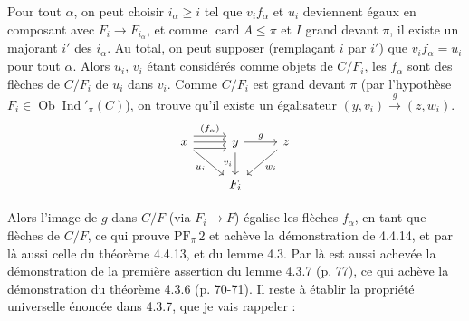 \documentclass[11pt]{article}
\newcommand{\printedpage}[1]{\marginpar{\footnotesize p.~#1}}
\newcommand{\msp}[1]{\marginpar{\footnotesize [#1]}}
\newcommand{\Ind}{\operatorname{Ind}}
\newcommand{\Ob}{\operatorname{Ob}}
\newcommand{\card}{\operatorname{card}}
\newcommand{\PF}{\mathrm{PF}}
\begin{document}
Pour tout $\alpha$, on peut choisir $i_\alpha\geqslant i$ tel que $v_if_\alpha$ et $u_i$ deviennent égaux en composant avec $F_i\longrightarrow F_{i_\alpha}$, et comme $\card A\leqslant\pi$ et $I$ grand devant $\pi$, il existe un majorant $i'$ des $i_\alpha$. Au total, on peut supposer (remplaçant $i$ par $i'$) que $v_if_\alpha=u_i$ pour tout $\alpha$. Alors $u_i$, $v_i$ étant considérés comme objets de $C/F_i$, les $f_\alpha$ sont des flèches de $C/F_i$ de $u_i$ dans $v_i$. Comme $C/F_i$ est grand devant $\pi$ (par l'hypothèse $F_i\in\Ob\Ind'_\pi(C)$), on trouve qu'il existe un égalisateur $(y,v_i)\xrightarrow{\;g\;}(z,w_i)$.
\printedpage{26}
\[
\begin{tikzcd}
x \arrow[r, shift left=2, "(f_\alpha)"] \arrow[r] \arrow[r, shift right=2] \arrow[dr, "u_i"'] & y \arrow[r, "g"] \arrow[d, "v_i"'] & z \arrow[dl, "w_i"] \\
& F_i &
\end{tikzcd}
\]

Alors l'image de $g$ dans $C/F$ (via $F_i\longrightarrow F$) égalise les flèches $f_\alpha$, en tant que flèches de $C/F$, ce qui prouve $\PF_\pi\,2$ et achève la démonstration de 4.4.14, et par là aussi celle du théorème 4.4.13, et du lemme 4.3. Par là est aussi achevée la démonstration de la première assertion du lemme
\msp{page 101}
4.3.7 (p. 77), ce qui achève la démonstration du théorème 4.3.6 (p. 70-71). Il reste à établir la propriété universelle énoncée dans 4.3.7, que je vais rappeler :
\end{document}
